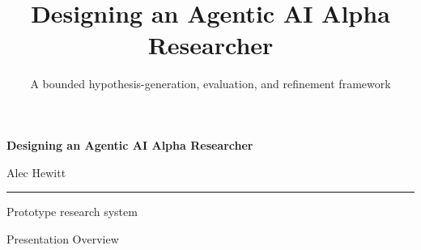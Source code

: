 \documentclass[10pt,aspectratio=169]{beamer}
\title{Designing an Agentic AI Alpha Researcher}
\subtitle{A bounded hypothesis-generation, evaluation, and refinement framework}
\author{}
\institute{Prototype research system}
\date{}
\begin{document}
\begin{frame}[plain]
  \vspace{1.2cm}
  {\Large\bfseries Designing an Agentic AI Alpha Researcher}

  \vspace{0.25cm}
  {\normalsize\color{Muted} Alec Hewitt}

  \vfill
  {\color{Rule}\rule{\textwidth}{0.4pt}}
  {\small\color{Muted} Prototype research system \hfill }
\end{frame}

\begin{frame}{Presentation Overview}

    \tableofcontents

\end{frame}
\end{document}
